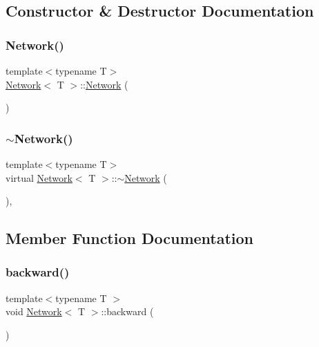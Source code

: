 \subsection{Constructor \& Destructor Documentation}
\mbox{\label{class_network_aa2db3657dea83a6a152633a8eb4d41ce}} 
\subsubsection{\texorpdfstring{Network()}{Network()}}
{\footnotesize\ttfamily template$<$typename T$>$ \\
\mbox{\hyperlink{class_network}{Network}}$<$ T $>$\+::\mbox{\hyperlink{class_network}{Network}} (\begin{DoxyParamCaption}{ }\end{DoxyParamCaption})\hspace{0.3cm}{\ttfamily [default]}}

\mbox{\label{class_network_a9717c0b897ff9d602ad91f57159ba4dd}} 
\subsubsection{\texorpdfstring{$\sim$Network()}{~Network()}}
{\footnotesize\ttfamily template$<$typename T$>$ \\
virtual \mbox{\hyperlink{class_network}{Network}}$<$ T $>$\+::$\sim$\mbox{\hyperlink{class_network}{Network}} (\begin{DoxyParamCaption}{ }\end{DoxyParamCaption})\hspace{0.3cm}{\ttfamily [virtual]}, {\ttfamily [default]}}



\subsection{Member Function Documentation}
\mbox{\label{class_network_a0656d4106aded16e8663ff8fbfec1f3e}} 
\subsubsection{\texorpdfstring{backward()}{backward()}}
{\footnotesize\ttfamily template$<$typename T $>$ \\
void \mbox{\hyperlink{class_network}{Network}}$<$ T $>$\+::backward (\begin{DoxyParamCaption}{ }\end{DoxyParamCaption})\hspace{0.3cm}{\ttfamily [virtual]}}

